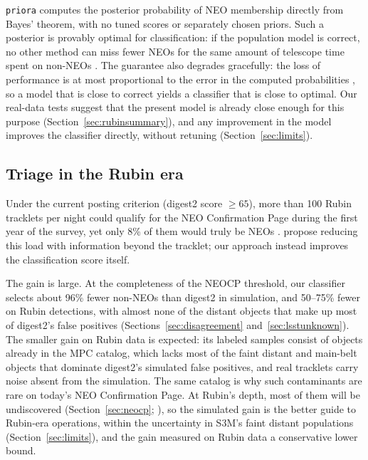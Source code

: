 \documentclass[linenumbers,twocolumn]{aastex701}
\newcommand{\priora}{{\tt priora}\xspace} %
\begin{document}
\priora computes the posterior probability of NEO membership directly from
Bayes' theorem, with no tuned scores or separately chosen priors. Such a
posterior is provably optimal for classification: if the population model
is correct, no other method can miss fewer NEOs for the same amount of
telescope time spent on non-NEOs \citep{duda2001}. The guarantee also
degrades gracefully: the loss of performance is at most proportional to the
error in the computed probabilities \citep{devroye1996}, so a model that is
close to correct yields a classifier that is close to optimal. Our real-data
tests suggest that the present model is already close enough for this
purpose (Section~\ref{sec:rubinsummary}), and any improvement in the model
improves the classifier directly, without retuning
(Section~\ref{sec:limits}).

\subsection{Triage in the Rubin era}
\label{sec:lsstera}

Under the current posting criterion (digest2 score $\geq65$), more than 100
Rubin tracklets per night could qualify for the NEO Confirmation Page
during the first year of the survey, yet only 8\% of them would truly be NEOs
\citep{wagg2025}. \citet{wagg2025} propose reducing this load with
information beyond the tracklet; our approach instead improves the
classification score itself.

The gain is large. At the completeness of the NEOCP threshold, our
classifier selects about 96\% fewer non-NEOs than digest2 in simulation,
and 50--75\% fewer on Rubin detections, with almost none of the distant
objects that make up most of digest2's false positives
(Sections~\ref{sec:disagreement} and~\ref{sec:lsstunknown}). The smaller
gain on Rubin data is expected: its labeled samples consist of objects
already in the MPC catalog, which lacks most of the faint distant and
main-belt objects that dominate digest2's simulated false positives, and
real tracklets carry noise absent from the simulation. The same catalog
is why such contaminants are rare on today's NEO Confirmation Page. At
Rubin's depth, most of them will be undiscovered
(Section~\ref{sec:neocp}; \citealt{kurlander2025}), so the simulated gain
is the better guide to Rubin-era operations, within the uncertainty in
S3M's faint distant populations (Section~\ref{sec:limits}), and the gain
measured on Rubin data a conservative lower bound.
\end{document}
